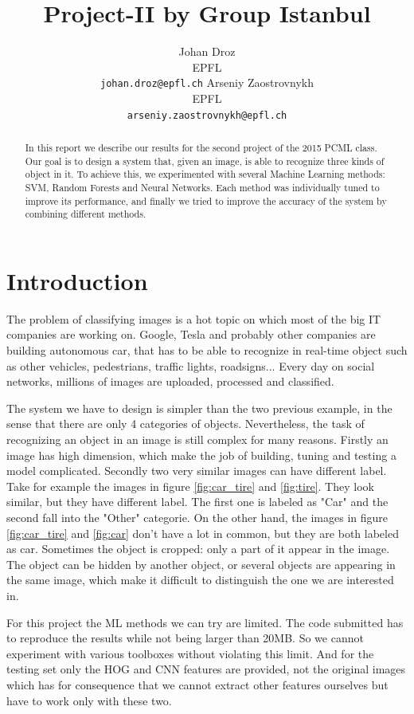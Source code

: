 \documentclass{article} %
\title{Project-II by Group Istanbul}
\author{
Johan Droz\\
EPFL \\
\texttt{johan.droz@epfl.ch} \And
Arseniy Zaostrovnykh\\
EPFL \\
\texttt{arseniy.zaostrovnykh@epfl.ch}
}
\begin{document}
\maketitle

\begin{abstract}
In this report we describe our results for the second project of the 2015 PCML class.
Our goal is to design a system that, given an image, is able to recognize three kinds of object in it.
To achieve this, we experimented with several Machine Learning methods: SVM, Random Forests and Neural Networks. Each method was individually tuned to improve its performance, and finally we tried to improve the accuracy of the system by combining different methods.

\end{abstract}

\section{Introduction}

The problem of classifying images is a hot topic on which most of the big IT companies are working on.
Google\cite{GoogleCar}, Tesla\cite{TeslaAutopilot} and probably other companies are building autonomous car, that has to be able to recognize in real-time object such as other vehicles, pedestrians, traffic lights, roadsigns...
Every day on social networks, millions of images are uploaded, processed and classified\cite{facebook}. 

The system we have to design is simpler than the two previous example, in the sense that there are only 4 categories of objects. Nevertheless, the task of recognizing an object in an image is still complex for many reasons.
Firstly an image has high dimension, which make the job of building, tuning and testing a model complicated.
Secondly two very similar images can have different label.
Take for example the images in figure \ref{fig:car_tire} and \ref{fig:tire}. They look similar, but they have different label. The first one is labeled as "Car" and the second fall into the "Other" categorie. On the other hand, the images in figure \ref{fig:car_tire} and \ref{fig:car} don't have a lot in common, but they are both labeled as car.
Sometimes the object is cropped: only a part of it appear in the image. The object can be hidden by another object, or several objects are appearing in the same image, which make it difficult to distinguish the one we are interested in.

For this project the ML methods we can try are limited. The code submitted has to reproduce the results while not being larger than 20MB. So we cannot experiment with various toolboxes without violating this limit.
And for the testing set only the HOG and CNN features are provided, not the original images which has for consequence that we cannot extract other features ourselves but have to work only with these two.
\end{document}
